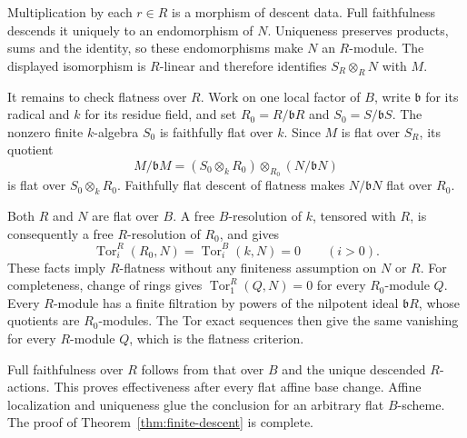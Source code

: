 Multiplication by each $r\in R$ is a morphism of descent data. Full faithfulness descends it uniquely to an endomorphism of $N$. Uniqueness preserves products, sums and the identity, so these endomorphisms make $N$ an $R$-module. The displayed isomorphism is $R$-linear and therefore identifies $S_R\otimes_RN$ with $M$.

It remains to check flatness over $R$. Work on one local factor of $B$, write $\mathfrak b$ for its radical and $k$ for its residue field, and set $R_0=R/\mathfrak bR$ and $S_0=S/\mathfrak bS$. The nonzero finite $k$-algebra $S_0$ is faithfully flat over $k$. Since $M$ is flat over $S_R$, its quotient
\[
 M/\mathfrak bM=(S_0\otimes_kR_0)\otimes_{R_0}(N/\mathfrak bN)
\]
is flat over $S_0\otimes_kR_0$. Faithfully flat descent of flatness makes $N/\mathfrak bN$ flat over $R_0$.

Both $R$ and $N$ are flat over $B$. A free $B$-resolution of $k$, tensored with $R$, is consequently a free $R$-resolution of $R_0$, and gives
\[
 \operatorname{Tor}_i^R(R_0,N)=\operatorname{Tor}_i^B(k,N)=0
 \qquad(i>0).
\]
These facts imply $R$-flatness without any finiteness assumption on $N$ or $R$. For completeness, change of rings gives $\operatorname{Tor}_1^R(Q,N)=0$ for every $R_0$-module $Q$. Every $R$-module has a finite filtration by powers of the nilpotent ideal $\mathfrak bR$, whose quotients are $R_0$-modules. The Tor exact sequences then give the same vanishing for every $R$-module $Q$, which is the flatness criterion.

Full faithfulness over $R$ follows from that over $B$ and the unique descended $R$-actions. This proves effectiveness after every flat affine base change. Affine localization and uniqueness glue the conclusion for an arbitrary flat $B$-scheme. The proof of Theorem~\ref{thm:finite-descent} is complete.
